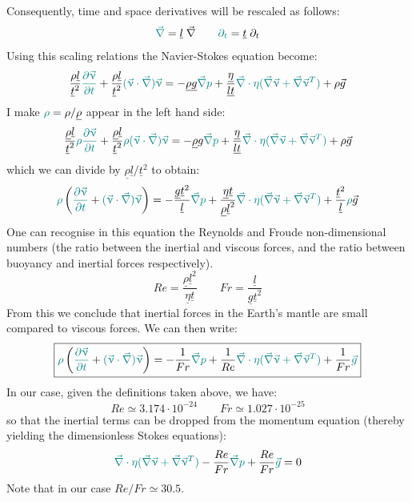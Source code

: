 Consequently, time and space derivatives will be rescaled as follows:
\[
{\color{teal} \vec\nabla} = \underline{l}\; \vec\nabla
\qquad
{\color{teal} \partial_t} = \underline{t}\; \partial_t 
\]
Using this scaling relations the Navier-Stokes equation become:
\[
\frac{\rho \underline{l}}{\underline{t}^2} {\color{teal} \frac{\partial \vec\upnu}{\partial t}}
+
\frac{\rho \underline{l}}{\underline{t}^2} {\color{teal} (\vec\upnu \cdot\vec\nabla) \vec\upnu} 
=
- \underline{\rho} \underline{g} {\color{teal} \vec\nabla p}
+
\frac{\underline{\eta}}{\underline{l}\underline{t}} 
{\color{teal} \vec\nabla \cdot \eta (\vec\nabla \vec \upnu + \vec\nabla \vec \upnu ^T)}
+ \rho \vec{g}
\]
I make ${\color{teal}\rho}= \rho/\underline{\rho}$ appear in the left hand side:
\[
\frac{\underline{\rho} \underline{l}}{\underline{t}^2}
{\color{teal}\rho}
 {\color{teal} \frac{\partial \vec\upnu}{\partial t}}
+
\frac{\underline{\rho} \underline{l}}{\underline{t}^2} 
{\color{teal}\rho}
{\color{teal} (\vec\upnu \cdot\vec\nabla) \vec\upnu} 
=
- \underline{\rho} g {\color{teal} \vec\nabla p}
+
\frac{\underline{\eta}}{\underline{l}\underline{t}} 
{\color{teal} \vec\nabla \cdot \eta (\vec\nabla \vec \upnu + \vec\nabla \vec \upnu ^T)}
+ \rho \vec{g}
\]
which we can divide by $\underline{\rho} \underline{l}/\underline{t}^2$ to obtain:
\[
 {\color{teal}\rho} \left(
{\color{teal} \frac{\partial \vec\upnu}{\partial t}}
+
{\color{teal} (\vec\upnu \cdot\vec\nabla) \vec\upnu} 
\right)
=
- \frac{ \underline{g} \underline{t}^2 }{\underline{l}} {\color{teal} \vec\nabla p}
+
\frac{\underline{\eta} \underline{t}}{\underline{\rho} \underline{l}^2 } 
{\color{teal} \vec\nabla \cdot \eta (\vec\nabla \vec \upnu + \vec\nabla \vec \upnu ^T)}
+ \frac{\underline{t}^2}{ \underline{l}}  {\color{teal} \rho} \vec{g}
\]
One can recognise in this equation the Reynolds and Froude 
non-dimensional numbers (the ratio between the inertial and viscous forces, and the 
ratio between buoyancy and inertial forces respectively). 
\[
Re = \frac{\underline{\rho} \underline{l}^2}{\underline{\eta} \underline{t} }
\qquad
Fr= \frac{\underline{l}}{\underline{g}\underline{t}^2 }
\]
From this we conclude that inertial forces in the Earth's mantle
are small compared to viscous forces.
We can then write:
\[
\boxed{
{\color{teal}\rho} \left(
{\color{teal} \frac{\partial \vec\upnu}{\partial t}}
+
{\color{teal} (\vec\upnu \cdot\vec\nabla) \vec\upnu}  \right)
=
- \frac{1}{Fr} {\color{teal} \vec\nabla p}
+
\frac{1}{Re}
{\color{teal} \vec\nabla \cdot \eta (\vec\nabla \vec \upnu + \vec\nabla \vec \upnu ^T)}
+ \frac{1}{Fr} {\color{teal} \vec{g}}
}
\]
In our case, given the definitions taken above, we have:
\[
Re \simeq 3.174 \cdot 10^{-24}
\qquad
Fr \simeq 1.027 \cdot 10^{-25}
\]
so that the inertial terms can be dropped from the momentum equation (thereby yielding the 
dimensionless Stokes equations):
\[
{\color{teal} \vec\nabla \cdot \eta (\vec\nabla \vec \upnu + \vec\nabla \vec \upnu ^T)}
- \frac{Re}{Fr} {\color{teal} \vec\nabla p}
+ \frac{Re}{Fr}  {\color{teal} \vec{g} }
=0
\]
Note that in our case $Re/Fr\simeq 30.5$. 

